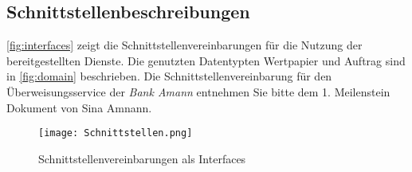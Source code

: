 \documentclass[12pt, a4paper, titlepage]{article}
\begin{document}
\subsection{Schnittstellenbeschreibungen}
\autoref{fig:interfaces} zeigt die Schnittstellenvereinbarungen für die Nutzung
der bereitgestellten Dienste. Die genutzten Datentypten Wertpapier und Auftrag
sind in \autoref{fig:domain} beschrieben. Die Schnittstellenvereinbarung für
den Überweisungsservice der \textit{Bank Amann} entnehmen Sie bitte dem
1. Meilenstein Dokument von Sina Amnann.
\label{subsec:Schnittstellen}
\begin{figure}[H]
	\centering
    \texttt{[image: Schnittstellen.png]}
	\caption{Schnittstellenvereinbarungen als Interfaces}
	\label{fig:interfaces}
\end{figure}
\end{document}
